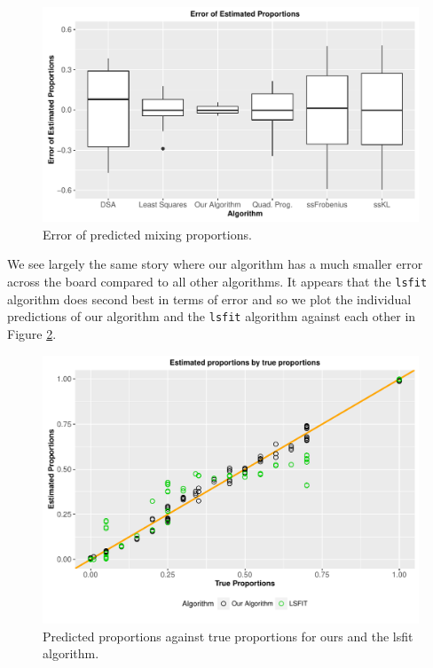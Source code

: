 \documentclass[reqno,12pt,oneside]{report}\usepackage[]{graphicx}\usepackage[]{color}
\makeatletter
\def\maxwidth{ %
  \ifdim\Gin@nat@width>\linewidth
    \linewidth
  \else
    \Gin@nat@width
  \fi
}
\newenvironment{knitrout}{}{} %
\renewenvironment{knitrout}{\begin{small}}{\end{small}}
\theoremstyle{plain}
\theoremstyle{definition}
\theoremstyle{remark}
\numberwithin{theorem}{chapter}     %
\makeatother
\begin{document}
\begin{figure}[ht]
  \centering
\begin{knitrout}
\color{fgcolor}
\includegraphics[width=\maxwidth]{figure/plot2-1} 

\end{knitrout}
\caption{Error of predicted mixing proportions.}
\label{fig:ratbox}
\end{figure}

We see largely the same story where our algorithm has a much smaller error across the board compared to all other algorithms. It appears that the \verb+lsfit+ algorithm does second best in terms of error and so we plot the individual predictions of our algorithm and the \verb+lsfit+ algorithm against each other in Figure \ref{fig:rat}.

\begin{figure}[ht]
  \centering
\begin{knitrout}
\color{fgcolor}
\includegraphics[width=\maxwidth]{figure/plot1-1} 

\end{knitrout}
\caption{Predicted proportions against true proportions for ours and the lsfit algorithm.}
\label{fig:rat}
\end{figure}
\end{document}
